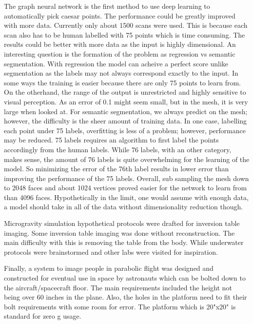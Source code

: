 The graph neural network is the first method to use deep learning to automatically pick caesar points. The performance could be greatly improved with more data. Currently only about 1500 scans were used. This is because each scan also has to be human labelled with 75 points which is time consuming. The results could be better with more data as the input is highly dimensional. An interesting question is the formation of the problem as regression vs semantic segmentation. With regression the model can acheive a perfect score unlike segmentation as the labels may not always correspond exactly to the input. In some ways the training is easier because there are only 75 points to learn from. On the otherhand, the range of the output is unrestricted and highly sensitive to visual perception. As an error of 0.1 might seem small, but in the mesh, it is very large when looked at. For semantic segmentation, we always predict on the mesh; however, the difficulty is the sheer amount of training data. In one case, labelling each point under 75 labels, overfitting is less of a problem; however, performance may be reduced. 75 labels requires an algorithm to first label the points accordingly from the human labels. While 76 labels, with an other category, makes sense, the amount of 76 labels is quite overwhelming for the learning of the model. So minimizing the error of the 76th label results in lower error than improving the performance of the 75 labels. Overall, sub sampling the mesh down to 2048 faces and about 1024 vertices proved easier for the network to learn from than 4096 faces. Hypothetically in the limit, one would assume with enough data, a model should take in all of the data without dimensionality reduction though.

Microgravity simulation hypothetical protocols were drafted for inversion table imaging. Some inversion table imaging was done without reconstruction. The main difficulty with this is removing the table from the body. While underwater protocols were brainstormed and other labs were visited for inspiration.

Finally, a system to image people in parabolic flight was designed and constructed for eventual use in space by astronauts which can be bolted down to the aircraft/spacecraft floor. The main requirements included the height not being over 60 inches in the plane. Also, the holes in the platform need to fit their bolt requirements with some room for error. The platform which is 20"x20" is standard for zero g usage.
